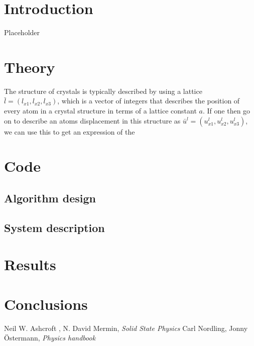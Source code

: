 \documentclass[11pt]{article}
\begin{document}
\section{Introduction}
Placeholder
\section{Theory}
The structure of crystals is typically described by using a lattice $\bar{l} = (l_{x1}, l_{x2}, l_{x3})$, which is a vector of integers that describes the position of every atom in a crystal structure in terms of a lattice constant $a$. If one then go on to describe an atoms displacement in this structure as $\bar{u}^l = (u^l_{x1},u^l_{x2},u^l_{x3})$, we can use this to get an expression of the 
\
\section{Code}
\subsection{Algorithm design}
\subsection{System description}

\section{Results}

\section{Conclusions}
\begin{thebibliography}{99}
 Neil W. Ashcroft , N. David Mermin, \textit{Solid State Physics} 
\bibitem{bib:ph} Carl Nordling, Jonny Östermann, \textit{Physics handbook}
\end{thebibliography}
\end{document}
